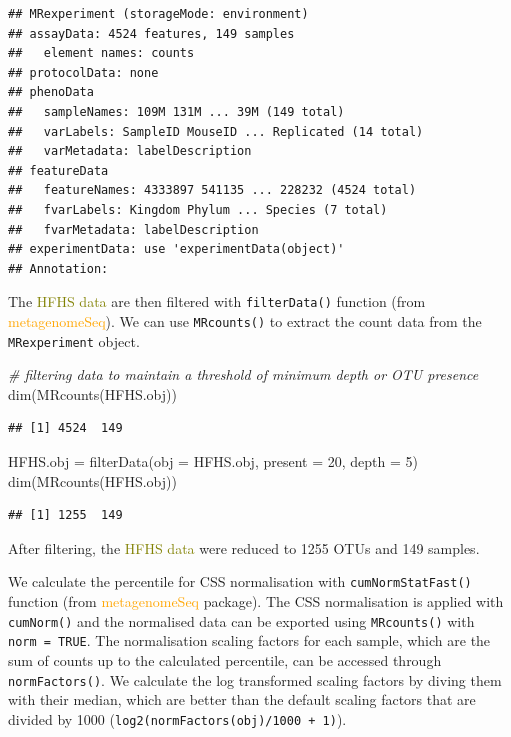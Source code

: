 \documentclass[
]{book}
\newenvironment{Shaded}{\begin{snugshade}}{\end{snugshade}}
\newcommand{\AttributeTok}[1]{\textcolor[rgb]{0.77,0.63,0.00}{#1}}
\newcommand{\CommentTok}[1]{\textcolor[rgb]{0.56,0.35,0.01}{\textit{#1}}}
\newcommand{\DecValTok}[1]{\textcolor[rgb]{0.00,0.00,0.81}{#1}}
\newcommand{\FunctionTok}[1]{\textcolor[rgb]{0.00,0.00,0.00}{#1}}
\newcommand{\NormalTok}[1]{#1}
\newcommand{\OtherTok}[1]{\textcolor[rgb]{0.56,0.35,0.01}{#1}}
\begin{document}
\begin{verbatim}
## MRexperiment (storageMode: environment)
## assayData: 4524 features, 149 samples 
##   element names: counts 
## protocolData: none
## phenoData
##   sampleNames: 109M 131M ... 39M (149 total)
##   varLabels: SampleID MouseID ... Replicated (14 total)
##   varMetadata: labelDescription
## featureData
##   featureNames: 4333897 541135 ... 228232 (4524 total)
##   fvarLabels: Kingdom Phylum ... Species (7 total)
##   fvarMetadata: labelDescription
## experimentData: use 'experimentData(object)'
## Annotation:
\end{verbatim}

The \textcolor{olive}{HFHS data} are then filtered with \texttt{filterData()} function (from \textcolor{orange}{metagenomeSeq}). We can use \texttt{MRcounts()} to extract the count data from the \texttt{MRexperiment} object.

\begin{Shaded}
\begin{Highlighting}[]
\CommentTok{\# filtering data to maintain a threshold of minimum depth or OTU presence}
\FunctionTok{dim}\NormalTok{(}\FunctionTok{MRcounts}\NormalTok{(HFHS.obj))}
\end{Highlighting}
\end{Shaded}

\begin{verbatim}
## [1] 4524  149
\end{verbatim}

\begin{Shaded}
\begin{Highlighting}[]
\NormalTok{HFHS.obj }\OtherTok{=} \FunctionTok{filterData}\NormalTok{(}\AttributeTok{obj =}\NormalTok{ HFHS.obj, }\AttributeTok{present =} \DecValTok{20}\NormalTok{, }\AttributeTok{depth =} \DecValTok{5}\NormalTok{)}
\FunctionTok{dim}\NormalTok{(}\FunctionTok{MRcounts}\NormalTok{(HFHS.obj))}
\end{Highlighting}
\end{Shaded}

\begin{verbatim}
## [1] 1255  149
\end{verbatim}

After filtering, the \textcolor{olive}{HFHS data} were reduced to 1255 OTUs and 149 samples.

We calculate the percentile for CSS normalisation with \texttt{cumNormStatFast()} function (from \textcolor{orange}{metagenomeSeq} package). The CSS normalisation is applied with \texttt{cumNorm()} and the normalised data can be exported using \texttt{MRcounts()} with \texttt{norm\ =\ TRUE}. The normalisation scaling factors for each sample, which are the sum of counts up to the calculated percentile, can be accessed through \texttt{normFactors()}. We calculate the log transformed scaling factors by diving them with their median, which are better than the default scaling factors that are divided by 1000 (\texttt{log2(normFactors(obj)/1000\ +\ 1)}).
\end{document}
